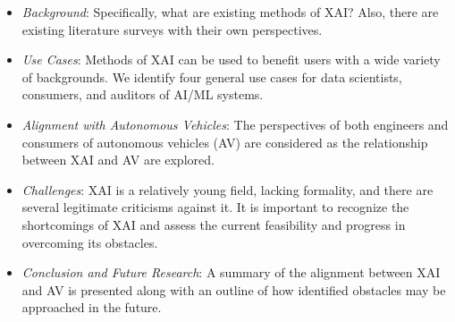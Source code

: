 \begin{itemize}
    \item\textit{Background}: Specifically, what are existing methods of XAI?  Also, there are existing literature surveys with their own perspectives.

    \item\textit{Use Cases}: Methods of XAI can be used to benefit users with a wide variety of backgrounds.  We identify four general use cases for data scientists, consumers, and auditors of AI/ML systems.

    \item\textit{Alignment with Autonomous Vehicles}: The perspectives of both engineers and consumers of autonomous vehicles (AV) are considered as the relationship between XAI and AV are explored.

    \item\textit{Challenges}: XAI is a relatively young field, lacking formality, and there are several legitimate criticisms against it.  It is important to recognize the shortcomings of XAI and assess the current feasibility and progress in overcoming its obstacles.

    \item\textit{Conclusion and Future Research}: A summary of the alignment between XAI and AV is presented along with an outline of how identified obstacles may be approached in the future.
\end{itemize}
